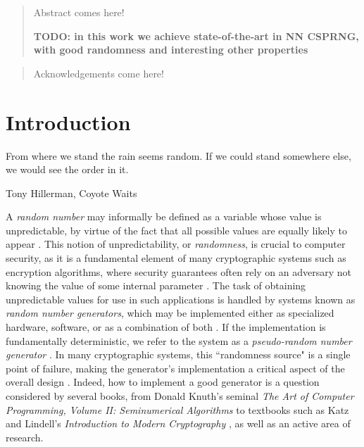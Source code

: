 \documentclass[12pt, titlepage]{report}
\theoremstyle{definition}
\begin{document}

\begin{abstract}
Abstract comes here!

\textbf{TODO: in this work we achieve state-of-the-art in NN CSPRNG, with good randomness and interesting other properties}
\end{abstract}


\renewcommand{\abstractname}{Acknowledgements}
\begin{abstract}
Acknowledgements come here!
\end{abstract}



\tableofcontents
\clearpage


\listoftables
\clearpage

\chapter{Introduction}
\epigraph{From where we stand the rain seems random. If we could stand somewhere else, we would see the order in it.}{Tony Hillerman, Coyote Waits}

A \emph{random number} may informally be defined as a variable whose value is unpredictable, by virtue of the fact that all possible values are equally likely to appear \cite[p. 7]{barker2007recommendation}. This notion of unpredictability, or \emph{randomness}, is crucial to computer security, as it is a fundamental element of many cryptographic systems such as encryption algorithms, where security guarantees often rely on an adversary not knowing the value of some internal parameter \cite[p. 169]{menezes1996handbook} \cite[p. 1]{kelsey1998cryptanalytic}. The task of obtaining unpredictable values for use in such applications is handled by systems known as \emph{random number generators}, which may be implemented either as specialized hardware, software, or as a combination of both \cite[p. 196, 172]{menezes1996handbook}. If the implementation is fundamentally deterministic, we refer to the system as a \emph{pseudo-random number generator} \cite[p. 169]{menezes1996handbook}. In many cryptographic systems, this ``randomness source" is a single point of failure, making the generator's implementation a critical aspect of the overall design \cite[p. 2]{kelsey1998cryptanalytic}. Indeed, how to implement a good generator is a question considered by several books, from Donald Knuth's seminal \textit{The Art of Computer Programming, Volume II: Seminumerical Algorithms} \cite{donald1998art} to textbooks such as Katz and Lindell's \textit{Introduction to Modern Cryptography} \cite{katz2014introduction}, as well as an active area of research.
\end{document}
